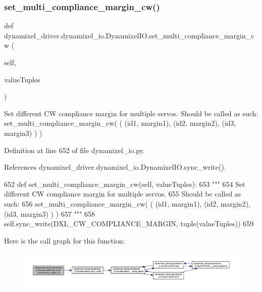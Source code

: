 \subsubsection{\texorpdfstring{set\+\_\+multi\+\_\+compliance\+\_\+margin\+\_\+cw()}{set\_multi\_compliance\_margin\_cw()}}
{\footnotesize\ttfamily def dynamixel\+\_\+driver.\+dynamixel\+\_\+io.\+Dynamixel\+I\+O.\+set\+\_\+multi\+\_\+compliance\+\_\+margin\+\_\+cw (\begin{DoxyParamCaption}\item[{}]{self,  }\item[{}]{value\+Tuples }\end{DoxyParamCaption})}

\begin{DoxyVerb}Set different CW compliance margin for multiple servos.
Should be called as such:
set_multi_compliance_margin_cw( ( (id1, margin1), (id2, margin2), (id3, margin3) ) )
\end{DoxyVerb}
 

Definition at line 652 of file dynamixel\+\_\+io.\+py.



References dynamixel\+\_\+driver.\+dynamixel\+\_\+io.\+Dynamixel\+I\+O.\+sync\+\_\+write().


\begin{DoxyCode}
652     \textcolor{keyword}{def }set\_multi\_compliance\_margin\_cw(self, valueTuples):
653         \textcolor{stringliteral}{"""}
654 \textcolor{stringliteral}{        Set different CW compliance margin for multiple servos.}
655 \textcolor{stringliteral}{        Should be called as such:}
656 \textcolor{stringliteral}{        set\_multi\_compliance\_margin\_cw( ( (id1, margin1), (id2, margin2), (id3, margin3) ) )}
657 \textcolor{stringliteral}{        """}
658         self.sync\_write(DXL\_CW\_COMPLIANCE\_MARGIN, tuple(valueTuples))
659 
\end{DoxyCode}
Here is the call graph for this function\+:
\nopagebreak
\begin{figure}[H]
\begin{center}
\leavevmode
\includegraphics[width=350pt]{dd/d77/classdynamixel__driver_1_1dynamixel__io_1_1_dynamixel_i_o_a57b4bb815b4946e8759c512c3a7aec90_cgraph}
\end{center}
\end{figure}
\mbox{\label{classdynamixel__driver_1_1dynamixel__io_1_1_dynamixel_i_o_ab6ae4c7448f85ee22a95510a23be04b2}} 
